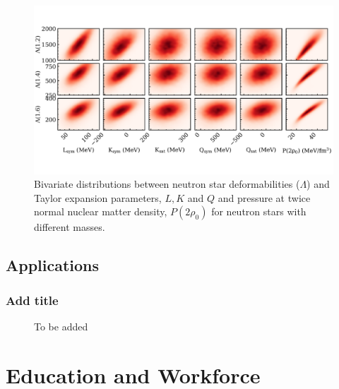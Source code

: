 \documentclass[%
10pt]{article}
\begin{document}
\begin{figure}[htb!]
\centering
\includegraphics[width=1.0\linewidth]{figures/lamda_LKQ.pdf}
\caption{
Bivariate distributions between neutron star deformabilities ($\Lambda$) and Taylor expansion parameters, $L, K$ and $Q$ and pressure at twice normal nuclear matter density, $P(2\rho_0)$ for neutron stars with different masses.
}
\end{figure}


\subsection{Applications}
\subsubsection{Add title}
\vspace{5mm}
\noindent
{}
\begin{figure}[htb!]
\centering
\caption{To be added}
\end{figure}
\clearpage
\newpage



\section{Education and Workforce}
\end{document}
